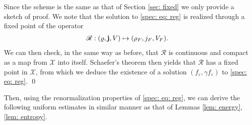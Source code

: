 \documentclass[10pt, reqno]{amsart}
\theoremstyle{plain}
\theoremstyle{definition}
\theoremstyle{remark}
\renewenvironment{proof}[1][\proofname]{\noindent{\scshape #1.\quad}}{\qed}
\numberwithin{equation}{section}
\newcommand{\bfj}{{\bf j}}
\newcommand{\scrR}{\mathscr R}
\newcommand{\scrX}{\mathscr X}
\newcommand{\ve}{\varepsilon}
\begin{document}
\begin{proof}
Since the scheme is the same as that of Section \ref{sec: fixed} we only provide a sketch of proof. We note that the solution to \eqref{spec: eq: reg} is realized through a fixed point of the operator
\begin{align*}
    \scrR : (\varrho, \bfj, V) \mapsto (\rho_F, j_F, V_F).
\end{align*}
We can then check, in the same way as before, that $\scrR$ is continuous and compact as a map from $\scrX$ into itself. Schaefer's theorem then yields that $\scrR$ has a fixed point in $\scrX$, from which we deduce the existence of a solution $(f_\ve,\gamma f_\ve)$ to \eqref{spec: eq: reg}.
\end{proof}

Then, using the renormalization properties of \eqref{spec: eq: reg}, we can derive the following uniform estimates in similar manner as that of Lemmas \ref{lem: energy}, \ref{lem: entropy}.
\end{document}
